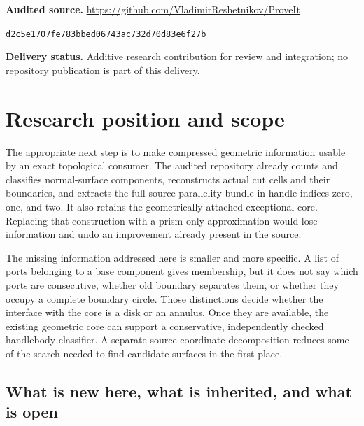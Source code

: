 \documentclass[11pt,a4paper]{article}
\theoremstyle{definition}
\begin{document}
\begin{titlepage}
\begin{abstract}
The deliverable includes additive Python implementations, separate checkers,
exact source fixtures, adversarial tests, independent Regina comparisons, and
reproduction scripts.  These are local algorithmic and geometric results.
They do not establish a quasi-polynomial bound for the complete recognizer:
useful-surface coverage, patterned-state transport, and global search bounds
remain explicit research obligations.
\end{abstract}
\vfill
\noindent\small\textbf{Audited source.}
\url{https://github.com/VladimirReshetnikov/ProveIt}\par
\noindent\small\texttt{d2c5e1707fe783bbed06743ac732d70d83e6f27b}\par
\noindent\small\textbf{Delivery status.} Additive research contribution for review and
integration; no repository publication is part of this delivery.
\end{titlepage}
\hypersetup{pageanchor=true}

\tableofcontents
\newpage

\section{Research position and scope}
\label{main:position}

The appropriate next step is to make compressed geometric information usable
by an exact topological consumer.  The audited repository already counts and
classifies normal-surface components, reconstructs actual cut cells and their
boundaries, and extracts the full source parallelity bundle in handle indices
zero, one, and two.  It also retains the geometrically attached exceptional
core.  Replacing that construction with a prism-only approximation would lose
information and undo an improvement already present in the source.

The missing information addressed here is smaller and more specific.  A list
of ports belonging to a base component gives membership, but it does not say
which ports are consecutive, whether old boundary separates them, or whether
they occupy a complete boundary circle.  Those distinctions decide whether
the interface with the core is a disk or an annulus.  Once they are available,
the existing geometric core can support a conservative, independently checked
handlebody classifier.  A separate source-coordinate decomposition reduces
some of the search needed to find candidate surfaces in the first place.

\subsection{What is new here, what is inherited, and what is open}
\end{document}
